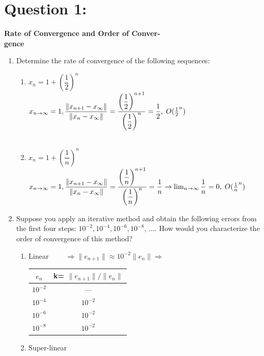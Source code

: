 \documentclass[a4paper,12pt]{article}
\begin{document}
\section*{\LARGE Question 1:}{ \LARGE \textbf{Rate of Convergence and Order of Conver-\\[0.2cm] gence}}
\begin{enumerate}[label=(\alph*)]
\item  Determine the rate of convergence of the following sequences:
\begin{enumerate}[label=(\roman*)]
\item $x_n = 1 + (\dfrac{1}{2})^n$\\
{\color{blue}{\Large Solution:}  $x_{n \to \infty} = 1, \dfrac{\|x_{n+1}-x_\infty\|}{\|x_n-x_\infty\|} = \dfrac{\left(\dfrac{1}{2}\right)^{n+1}}{\left(\dfrac{1}{2}\right)^n} = \dfrac{1}{2} , \; O({ 1 \over 2}^n)$\\[0.2cm] \color{black}}\\[0.4cm]
\item $x_n = 1 + (\dfrac{1}{n})^n$\\
{\color{blue}{\Large Solution:}  $x_{n \to \infty} = 1, \dfrac{\|x_{n+1}-x_\infty\|}{\|x_n-x_\infty\|} = \dfrac{\left(\dfrac{1}{n}\right)^{n+1}}{\left(\dfrac{1}{n}\right)^n} = \dfrac{1}{n} \rightarrow \lim_{n \to \infty} \dfrac{1}{n} =0, \; O({ 1 \over n}^n) $\\ \color{black}}
\end{enumerate}
\item Suppose you apply an iterative method and obtain the following errors from the first four steps: $10^{-2}, 10^{-4}, 10^{-6}, 10^{-8}$, .... How would you characterize the order of convergence of this method?
\begin{enumerate}[label=(\Alph*)]
\item {\color{blue} Linear $\qquad  \Rightarrow \| e_{n+1}\| \approx 10^{-2} \|e_{n}\| \Rightarrow $ \begin{tabular}{|c|c|}
\hline 
$e_{n}$ & k= $\|e_{n+1}\|/\|e_{n}\|$ \\ 
\hline 
$10^{-2}$ & --- \\ 
\hline 
$10^{-4}$ & $10^{-2}$ \\ 
\hline 
$10^{-6}$ & $10^{-2}$ \\ 
\hline 
$10^{-8}$ & $10^{-2}$ \\ 
\hline 
\end{tabular}}
\item Super-linear

\end{enumerate}
\end{enumerate}
\end{document}
